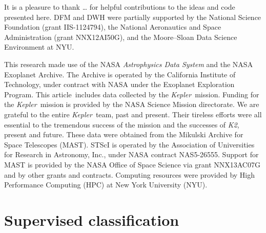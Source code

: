 \documentclass[twocolumn]{aastex6}
\newcommand{\project}[1]{\textsl{#1}}
\newcommand{\kepler}{\project{Kepler}}
\newcommand{\KT}{\project{K2}}
\newcommand{\paper}{article}
\newcommand{\figlabel}[1]{\label{fig:#1}}
\begin{document}
\acknowledgments
It is a pleasure to thank
\ldots
for helpful contributions to the ideas and code presented here.
DFM and DWH were partially supported by the National Science Foundation
(grant IIS-1124794),
the National Aeronautics and Space Administration
(grant NNX12AI50G), and the Moore--Sloan Data Science Environment at NYU.

This research made use of the NASA \project{Astrophysics Data System} and the
NASA Exoplanet Archive.
The Archive is operated by the California Institute of Technology, under
contract with NASA under the Exoplanet Exploration Program.
This \paper\ includes data collected by the \kepler\ mission. Funding for the
\kepler\ mission is provided by the NASA Science Mission directorate.
We are grateful to the entire \kepler\ team, past and present.
Their tireless efforts were all essential to the tremendous success of the mission
and the successes of \KT, present and future.
These data were obtained from the Mikulski Archive for Space Telescopes
(MAST).
STScI is operated by the Association of Universities for Research in
Astronomy, Inc., under NASA contract NAS5-26555.
Support for MAST is provided by the NASA Office of Space Science via grant
NNX13AC07G and by other grants and contracts.
Computing resources were provided by High Performance Computing (HPC) at New
York University (NYU).


\appendix

\section{Supervised classification}


\clearpage

\clearpage


\end{document}
